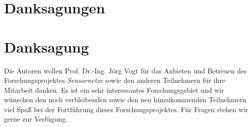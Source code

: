 



\ifCLASSOPTIONcompsoc
  \section*{Danksagungen}
\else
  \section*{Danksagung}
\fi

	Die Autoren wollen Prof. Dr.-Ing. Jörg Vogt für das Anbieten und Betreuen des
	Forschungsprojektes \emph{Sensornetze} sowie den anderen Teilnehmern
	für ihre Mitarbeit danken.
	Es ist ein sehr interessantes Forschungsgebiet und wir wünschen
	den noch verbleibenden sowie den neu hinzukommenden Teilnehmern
	viel Spaß bei der Fortführung dieses Forschungsprojektes.
	Für Fragen stehen wir gerne zur Verfügung.

